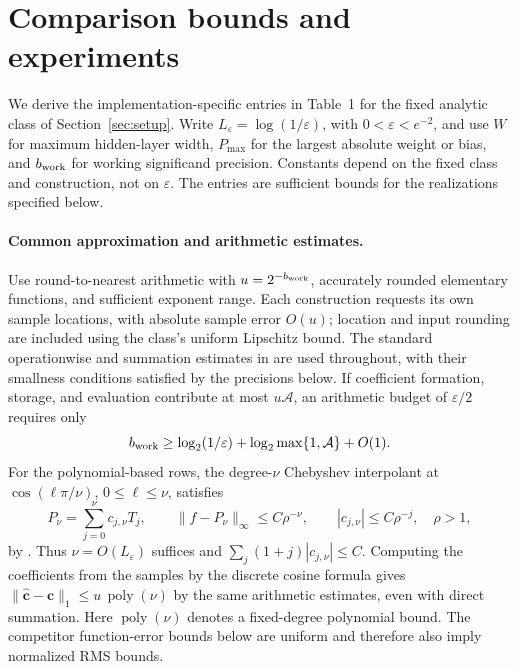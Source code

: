 \providecommand{\qeqref}[1]{(\ref{#1})}
\providecommand{\ComparisonTable}{Table~1}

\section{Comparison bounds and experiments}
\label{app:comparison-bounds}

We derive the implementation-specific entries in \ComparisonTable{} for the
fixed analytic class of Section~\ref{sec:setup}. Write
$L_\varepsilon=\log(1/\varepsilon)$, with $0<\varepsilon<e^{-2}$, and use
$W$ for maximum hidden-layer width, $P_{\max}$ for the largest absolute
weight or bias, and $b_{\rm work}$ for working significand precision. Constants depend on the fixed class and
construction, not on $\varepsilon$. The entries are sufficient bounds for the
realizations specified below.

\paragraph{Common approximation and arithmetic estimates.}
Use round-to-nearest arithmetic with $u=2^{-b_{\rm work}}$, accurately rounded
elementary functions, and sufficient exponent range. Each construction
requests its own sample locations, with absolute sample error $O(u)$; location
and input rounding are included using the class's uniform Lipschitz bound.
The standard operationwise and summation estimates in
\cite[Chs.~2--4]{Higham2002} are used throughout, with their smallness
conditions satisfied by the precisions below. If coefficient formation,
storage, and evaluation contribute at most $u\mathcal A$, an arithmetic
budget of $\varepsilon/2$ requires only
\begin{equation}
 b_{\rm work}\ge\log_2(1/\varepsilon)
       +\log_2\max\{1,\mathcal A\}+O(1).
 \label{eq:table-precision}
\end{equation}
For the polynomial-based rows, the degree-$\nu$ Chebyshev interpolant at
$\cos(\ell\pi/\nu)$, $0\le\ell\le\nu$, satisfies
\begin{equation}
 P_\nu=\sum_{j=0}^{\nu}c_{j,\nu}T_j,
 \qquad \|f-P_\nu\|_\infty\le C\rho^{-\nu},
 \qquad |c_{j,\nu}|\le C\rho^{-j},\quad \rho>1,
 \label{eq:cmp-chebyshev}
\end{equation}
by \cite[Chs.~4 and~8]{trefethen2019atap}. Thus $\nu=O(L_\varepsilon)$
suffices and $\sum_j(1+j)|c_{j,\nu}|\le C$. Computing the coefficients
from the samples by the discrete cosine formula gives
$\|\widehat{\boldsymbol c}-\boldsymbol c\|_1\le u\,\operatorname{poly}(\nu)$
by the same arithmetic estimates, even with direct summation. Here
$\operatorname{poly}(\nu)$ denotes a fixed-degree polynomial bound. The competitor
function-error bounds below are uniform and therefore also imply normalized
RMS bounds.

